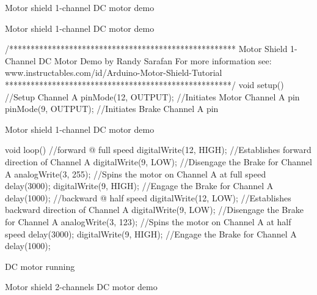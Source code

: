 \documentclass[compress]{beamer}
\begin{document}
{
    \begin{frame}{Motor shield 1-channel DC motor demo}
    \end{frame}
}

\begin{frame}[fragile]{Motor shield 1-channel DC motor demo}

\begin{cppcode}
/*****************************************************
Motor Shield 1-Channel DC Motor Demo
by Randy Sarafan
For more information see:
www.instructables.com/id/Arduino-Motor-Shield-Tutorial
*****************************************************/
void setup() {
//Setup Channel A
pinMode(12, OUTPUT); //Initiates Motor Channel A pin
pinMode(9, OUTPUT); //Initiates Brake Channel A pin
}
\end{cppcode}

\end{frame}

\begin{frame}[fragile]{Motor shield 1-channel DC motor demo}

\begin{cppcode}
void loop(){
  //forward @ full speed
  digitalWrite(12, HIGH); //Establishes forward direction of Channel A
  digitalWrite(9, LOW); //Disengage the Brake for Channel A
  analogWrite(3, 255); //Spins the motor on Channel A at full speed
  delay(3000);
  digitalWrite(9, HIGH); //Engage the Brake for Channel A
  delay(1000);
  //backward @ half speed
  digitalWrite(12, LOW); //Establishes backward direction of Channel A
  digitalWrite(9, LOW); //Disengage the Brake for Channel A
  analogWrite(3, 123); //Spins the motor on Channel A at half speed
  delay(3000);
  digitalWrite(9, HIGH); //Engage the Brake for Channel A
  delay(1000);
}
\end{cppcode}

\end{frame}


{
    \begin{frame}{DC motor running}
    \end{frame}
}

{
    \begin{frame}{Motor shield 2-channels DC motor demo}
    \end{frame}
}
\end{document}
